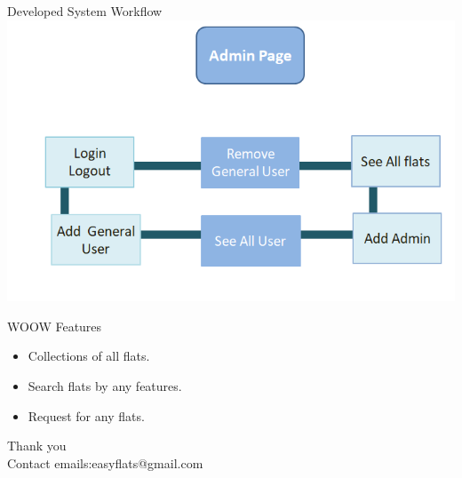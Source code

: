 \documentclass{beamer}
\begin{document}
\begin{frame}{Developed System Workflow}
\includegraphics[height=6 cm ,width= 10 cm]{Screenshot (16).png}
\end{frame}

\begin{frame}{WOOW Features}

\begin{itemize}
    \item Collections of all flats.
    \item Search flats by any features.
    \item Request for any flats.
\end{itemize}
    
\end{frame}

\begin{frame}
\begin{center}
Thank you\\
Contact emails:easyflats@gmail.com
\end{center}
\end{frame}



\end{document}
